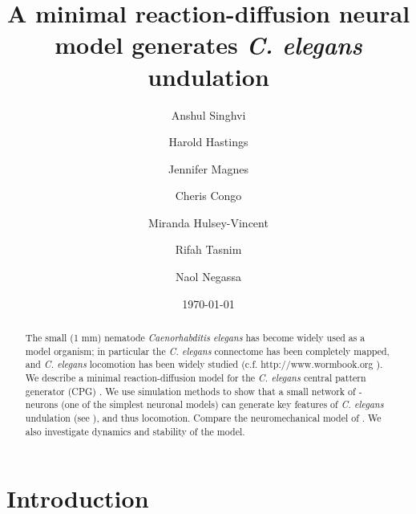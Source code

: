 \documentclass[
    11pt,
]{article}
\begin{document}


\title{A minimal reaction-diffusion neural model generates {\emph{C. elegans}} undulation}

\author[1]{Anshul Singhvi}

\author[1,3]{Harold Hastings}

\author[2]{Jennifer Magnes}

\author[2]{Cheris Congo}

\author[2]{Miranda Hulsey-Vincent}

\author[1]{Rifah Tasnim}

\author[1]{Naol Negassa}


\date{\today}

\begin{abstract}
    The small (1 mm) nematode \emph{Caenorhabditis elegans} has become widely used as a model organism; in particular the \emph{C. elegans} connectome has been completely mapped, and \emph{C. elegans} locomotion has been widely studied (c.f. http://www.wormbook.org \citet{corsi2015}). We describe a minimal reaction-diffusion model for the \emph{C. elegans} central pattern generator (CPG) \citet{xu2018,wen2012}. We use simulation methods to show that a small network of \citet{fitzhugh1955}-\citet{nagumo1962} neurons (one of the simplest neuronal models) can generate key features of \emph{C. elegans} undulation (see \citet{magnes2012}), and thus locomotion. Compare the neuromechanical model of \citet{izquierdo2018}. We also investigate dynamics and stability of the model.
\end{abstract}

\maketitle

\section{Introduction}\label{sec: intro}
\end{document}
